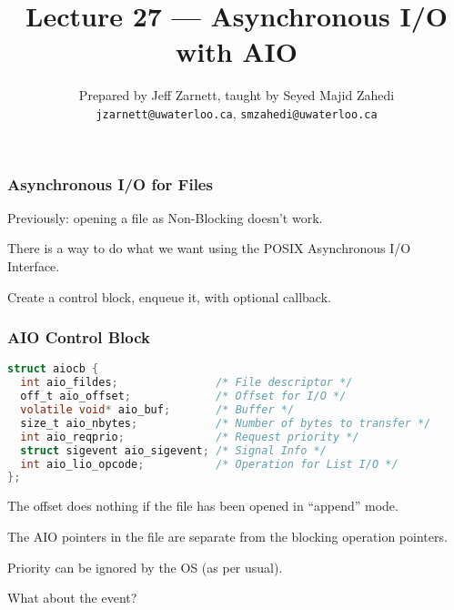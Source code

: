 

\title{Lecture 27 --- Asynchronous I/O with AIO }

\author{Prepared by Jeff Zarnett, taught by Seyed Majid Zahedi \\ \small \texttt{jzarnett@uwaterloo.ca}, \texttt{smzahedi@uwaterloo.ca}}

\date{}




\begin{frame}
	\titlepage

\end{frame}



\begin{frame}
	\frametitle{Asynchronous I/O for Files}

	Previously: opening a file as Non-Blocking doesn't work.

	There is a way to do what we want using the POSIX Asynchronous I/O Interface.

	Create a control block, enqueue it, with optional callback.

\end{frame}


\begin{frame}[fragile]
	\frametitle{AIO Control Block}

	\begin{lstlisting}[language=C]
struct aiocb {
  int aio_fildes;               /* File descriptor */
  off_t aio_offset;             /* Offset for I/O */
  volatile void* aio_buf;       /* Buffer */
  size_t aio_nbytes;            /* Number of bytes to transfer */
  int aio_reqprio;              /* Request priority */
  struct sigevent aio_sigevent; /* Signal Info */
  int aio_lio_opcode;           /* Operation for List I/O */
};
\end{lstlisting}

	The offset does nothing if the file has been opened in ``append'' mode.

	The AIO pointers in the file are separate from the blocking operation pointers.

	Priority can be ignored by the OS (as per usual).

	What about the event?

\end{frame}



